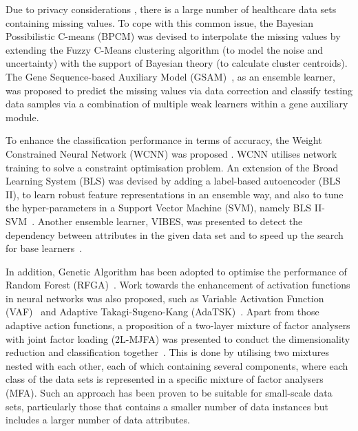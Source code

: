 \documentclass{article}
\newcommand*{\1}{\textcolor{magenta}}
\begin{document}
	Due to privacy considerations \cite{el2015anonymising,thompson2020ethical,chang2021ethical}, there is a large number of healthcare data sets containing missing values. To cope with this common issue, the Bayesian Possibilistic C-means (BPCM) \cite{li2019bayesian} was devised to interpolate the missing values by extending the Fuzzy C-Means clustering algorithm (to model the noise and uncertainty) with the support of Bayesian theory (to calculate cluster centroids). The Gene Sequence-based Auxiliary Model (GSAM)~\cite{lu2020machine}, as an ensemble learner, was proposed to predict the missing values via data correction and classify testing data samples via a combination of multiple weak learners within a gene auxiliary module.
	
	To enhance the classification performance in terms of accuracy, the Weight Constrained Neural Network (WCNN) was proposed \cite{livieris2019improving}. WCNN utilises network training to solve a constraint optimisation problem. An extension of the Broad Learning System (BLS) was devised by adding a label-based autoencoder (BLS II), to learn robust feature representations in an ensemble way, and also to tune the hyper-parameters in a Support Vector Machine (SVM), namely BLS II-SVM~\cite{tang2019construction}. Another ensemble learner, VIBES, was presented to detect the dependency between attributes in the given data set and to speed up the search for base learners~\cite{aydin2019construction}.
	
	In addition, Genetic Algorithm has been adopted to optimise the performance of Random Forest (RFGA)~\cite{elyan2017genetic}. Work towards the enhancement of activation functions in neural networks was also proposed, such as Variable Activation Function (VAF)~\cite{apicella2019simple} and Adaptive Takagi-Sugeno-Kang (AdaTSK)~\cite{8858838}. Apart from those adaptive action functions, a proposition of a two-layer mixture of factor analysers with joint factor loading (2L-MJFA) was presented to conduct the dimensionality reduction and classification together~\cite{yang2018new}. This is done by utilising two mixtures nested with each other, each of which containing several components, where each class of the data sets is represented in a specific mixture of factor analysers (MFA). Such an approach has been proven to be suitable for small-scale data sets, particularly those that contains a smaller number of data instances but includes a larger number of data attributes.
	
\end{document}
